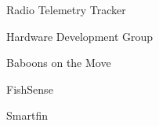 \item Radio Telemetry Tracker
\item Hardware Development Group
\item Baboons on the Move
\item FishSense
\item Smartfin
